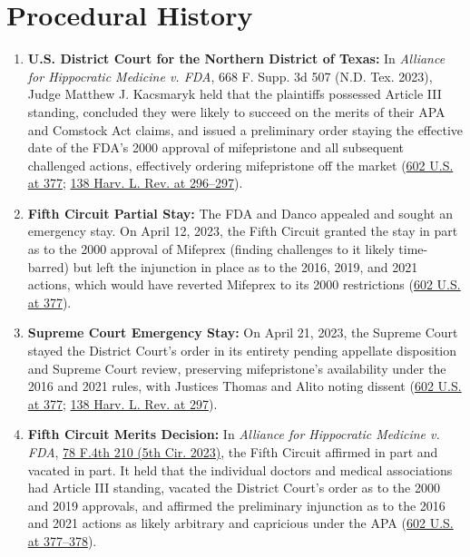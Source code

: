 \documentclass[12pt]{article}
\begin{document}
\section{Procedural History}

\begin{enumerate}
\item \textbf{U.S. District Court for the Northern District of Texas:} In \textit{Alliance for Hippocratic Medicine v. FDA}, 668 F. Supp. 3d 507 (N.D. Tex. 2023), Judge Matthew J. Kacsmaryk held that the plaintiffs possessed Article III standing, concluded they were likely to succeed on the merits of their APA and Comstock Act claims, and issued a preliminary order staying the effective date of the FDA's 2000 approval of mifepristone and all subsequent challenged actions, effectively ordering mifepristone off the market (\href{https://www.supremecourt.gov/opinions/23pdf/602us1r35_bqmd.pdf}{602 U.S. at 377}; \href{https://harvardlawreview.org/print/vol-138/fda-v-alliance-for-hippocratic-medicine/}{138 Harv. L. Rev. at 296--297}).

\item \textbf{Fifth Circuit Partial Stay:} The FDA and Danco appealed and sought an emergency stay. On April 12, 2023, the Fifth Circuit granted the stay in part as to the 2000 approval of Mifeprex (finding challenges to it likely time-barred) but left the injunction in place as to the 2016, 2019, and 2021 actions, which would have reverted Mifeprex to its 2000 restrictions (\href{https://www.supremecourt.gov/opinions/23pdf/602us1r35_bqmd.pdf}{602 U.S. at 377}).

\item \textbf{Supreme Court Emergency Stay:} On April 21, 2023, the Supreme Court stayed the District Court's order in its entirety pending appellate disposition and Supreme Court review, preserving mifepristone's availability under the 2016 and 2021 rules, with Justices Thomas and Alito noting dissent (\href{https://www.supremecourt.gov/opinions/23pdf/602us1r35_bqmd.pdf}{602 U.S. at 377}; \href{https://harvardlawreview.org/print/vol-138/fda-v-alliance-for-hippocratic-medicine/}{138 Harv. L. Rev. at 297}).

\item \textbf{Fifth Circuit Merits Decision:} In \textit{Alliance for Hippocratic Medicine v. FDA}, \href{https://law.justia.com/cases/federal/appellate-courts/ca5/23-10362/23-10362-2023-08-16.html}{78 F.4th 210 (5th Cir. 2023)}, the Fifth Circuit affirmed in part and vacated in part. It held that the individual doctors and medical associations had Article III standing, vacated the District Court's order as to the 2000 and 2019 approvals, and affirmed the preliminary injunction as to the 2016 and 2021 actions as likely arbitrary and capricious under the APA (\href{https://www.supremecourt.gov/opinions/23pdf/602us1r35_bqmd.pdf}{602 U.S. at 377--378}).


\end{enumerate}
\end{document}
